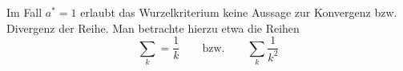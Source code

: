 Im Fall $a^*=1$ erlaubt das Wurzelkriterium keine Aussage zur Konvergenz bzw. Divergenz der Reihe. Man betrachte hierzu etwa die Reihen
$$\sum_k = \frac{1}{k} \qquad \text{bzw.} \qquad \sum_k \frac{1}{k^2}$$